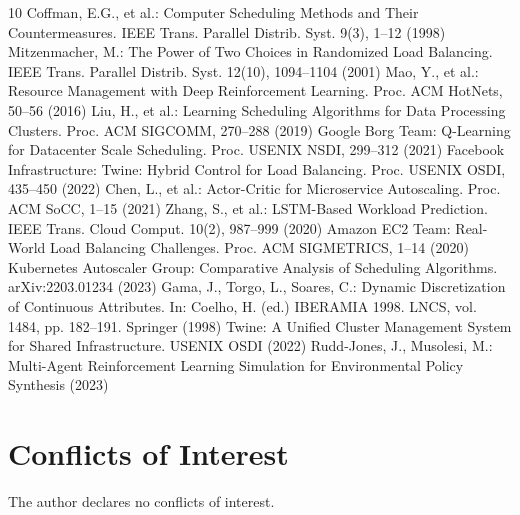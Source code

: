 \documentclass[runningheads]{llncs}
\begin{document}

\begin{thebibliography}{10}
 Coffman, E.G., et al.: Computer Scheduling Methods and Their Countermeasures. IEEE Trans. Parallel Distrib. Syst. 9(3), 1–12 (1998)
 Mitzenmacher, M.: The Power of Two Choices in Randomized Load Balancing. IEEE Trans. Parallel Distrib. Syst. 12(10), 1094–1104 (2001)
 Mao, Y., et al.: Resource Management with Deep Reinforcement Learning. Proc. ACM HotNets, 50–56 (2016)
 Liu, H., et al.: Learning Scheduling Algorithms for Data Processing Clusters. Proc. ACM SIGCOMM, 270–288 (2019)
 Google Borg Team: Q-Learning for Datacenter Scale Scheduling. Proc. USENIX NSDI, 299–312 (2021)
 Facebook Infrastructure: Twine: Hybrid Control for Load Balancing. Proc. USENIX OSDI, 435–450 (2022)
 Chen, L., et al.: Actor-Critic for Microservice Autoscaling. Proc. ACM SoCC, 1–15 (2021)
 Zhang, S., et al.: LSTM-Based Workload Prediction. IEEE Trans. Cloud Comput. 10(2), 987–999 (2020)
 Amazon EC2 Team: Real-World Load Balancing Challenges. Proc. ACM SIGMETRICS, 1–14 (2020)
 Kubernetes Autoscaler Group: Comparative Analysis of Scheduling Algorithms. arXiv:2203.01234 (2023)
 Gama, J., Torgo, L., Soares, C.: Dynamic Discretization of Continuous Attributes. In: Coelho, H. (ed.) IBERAMIA 1998. LNCS, vol. 1484, pp. 182–191. Springer (1998)
 Twine: A Unified Cluster Management System for Shared Infrastructure. USENIX OSDI (2022)
 Rudd-Jones, J., Musolesi, M.: Multi-Agent Reinforcement Learning Simulation for Environmental Policy Synthesis (2023)
\end{thebibliography}

\section*{Conflicts of Interest}
The author declares no conflicts of interest.
\end{document}
